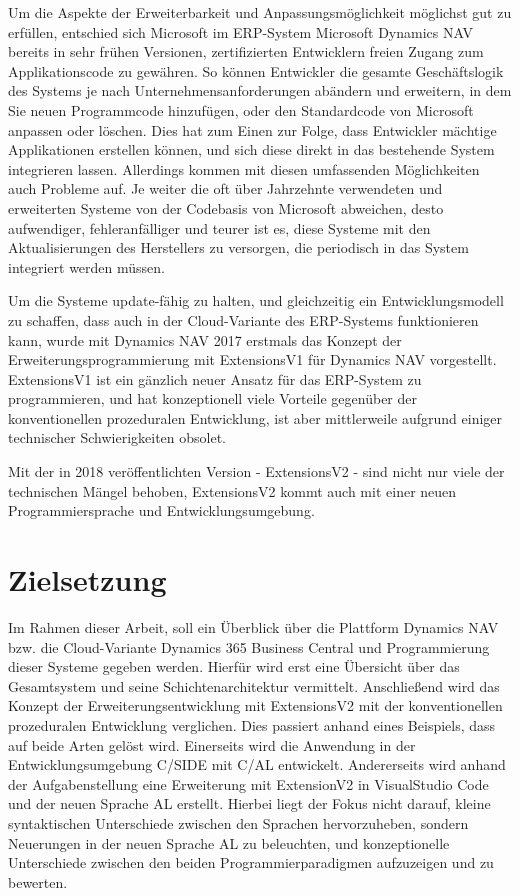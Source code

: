 Um die Aspekte der Erweiterbarkeit und Anpassungsmöglichkeit möglichst gut zu erfüllen, entschied sich Microsoft im ERP-System Microsoft Dynamics NAV bereits in sehr frühen Versionen, zertifizierten Entwicklern freien Zugang zum Applikationscode zu gewähren. So können Entwickler die gesamte Geschäftslogik des Systems je nach Unternehmensanforderungen abändern und erweitern, in dem Sie neuen Programmcode hinzufügen, oder den Standardcode von Microsoft anpassen oder löschen. Dies hat zum Einen zur Folge, dass Entwickler mächtige Applikationen erstellen können, und sich diese direkt in das bestehende System integrieren lassen. Allerdings kommen mit diesen umfassenden Möglichkeiten auch Probleme auf. Je weiter die oft über Jahrzehnte verwendeten und erweiterten Systeme von der Codebasis von Microsoft abweichen, desto aufwendiger, fehleranfälliger und teurer ist es, diese Systeme mit den Aktualisierungen des Herstellers zu versorgen, die periodisch in das System integriert werden müssen.  

Um die Systeme update-fähig zu halten, und gleichzeitig ein Entwicklungsmodell zu schaffen, dass auch in der Cloud-Variante des ERP-Systems funktionieren kann, wurde mit Dynamics NAV 2017 erstmals das Konzept der Erweiterungsprogrammierung mit ExtensionsV1 für Dynamics NAV vorgestellt. ExtensionsV1 ist ein gänzlich neuer Ansatz für das ERP-System zu programmieren, und hat konzeptionell viele Vorteile gegenüber der konventionellen prozeduralen Entwicklung, ist aber mittlerweile aufgrund einiger technischer Schwierigkeiten obsolet.

Mit der in 2018 veröffentlichten Version - ExtensionsV2 - sind nicht nur viele der technischen Mängel behoben, ExtensionsV2 kommt auch mit einer neuen Programmiersprache und Entwicklungsumgebung.

\section{Zielsetzung}
\label{sec:Zielsetzung}
Im Rahmen dieser Arbeit, soll ein Überblick über die Plattform Dynamics NAV bzw. die Cloud-Variante Dynamics 365 Business Central und Programmierung dieser Systeme gegeben werden. Hierfür wird erst eine Übersicht über das Gesamtsystem und seine Schichtenarchitektur vermittelt. Anschließend wird das Konzept der Erweiterungsentwicklung mit ExtensionsV2 mit der konventionellen prozeduralen Entwicklung verglichen. Dies passiert anhand eines Beispiels, dass auf beide Arten gelöst wird. Einerseits wird die Anwendung in der Entwicklungsumgebung C/SIDE mit C/AL entwickelt. Andererseits wird anhand der Aufgabenstellung eine Erweiterung mit ExtensionV2 in VisualStudio Code und der neuen Sprache AL erstellt. Hierbei liegt der Fokus nicht darauf, kleine syntaktischen Unterschiede zwischen den Sprachen hervorzuheben, sondern Neuerungen in der neuen Sprache AL zu beleuchten, und konzeptionelle Unterschiede zwischen den beiden Programmierparadigmen aufzuzeigen und zu bewerten.

